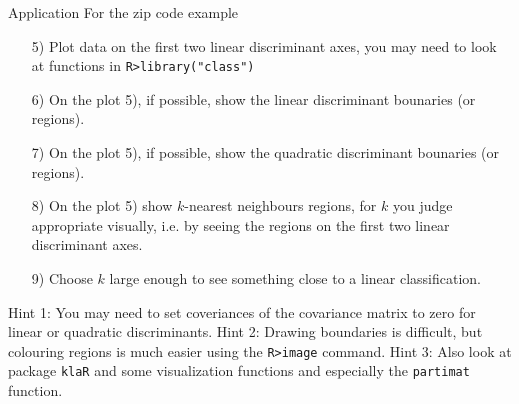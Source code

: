\begin{slide}{Application}
For the zip code example 
\begin{enumerate}
 \item[5)] Plot data on the first two linear discriminant axes, 
 you may need to look at functions in \texttt{R>library("class")}
 \item[6)] On the plot 5), if possible, show the linear discriminant bounaries (or regions).
 \item[7)] On the plot 5), if possible, show the quadratic discriminant bounaries (or regions).
 \item[8)] On the plot 5) show $k$-nearest neighbours regions, for $k$ you judge appropriate visually, i.e. 
 by seeing the regions on the first two linear discriminant axes. 
 \item[9)] Choose $k$ large enough to see something close to a linear classification.
 \end{enumerate}
Hint 1: You may need to set coveriances of the covariance matrix to zero for linear or quadratic discriminants.\newline
Hint 2: Drawing boundaries is difficult, but colouring regions is much easier using the \texttt{R>image} command.\newline
Hint 3: Also look at package \texttt{klaR} and some visualization functions and especially the \texttt{partimat} function.
\end{slide}



